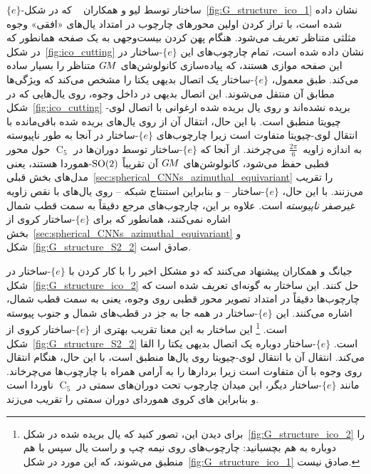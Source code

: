 $\{e\}$-ساختار توسط لیو و همکاران
~\cite{liu2018icoAltAz} که در شکل~\ref{fig:G_structure_ico_1} نشان داده شده است، با تراز کردن اولین محورهای چارچوب در امتداد یال‌های «افقی» وجوه مثلثی متناظر تعریف می‌شود.
هنگام پهن کردن بیست‌وجهی به یک صفحه همانطور که در شکل~\ref{fig:ico_cutting} نشان داده شده است، تمام چارچوب‌های این $\{e\}$-ساختار در این صفحه موازی هستند، که پیاده‌سازی کانولوشن‌های $G\mkern-1.4muM$ متناظر را بسیار ساده می‌کند.
طبق معمول، $\{e\}$-ساختار یک اتصال بدیهی یکتا را مشخص می‌کند که ویژگی‌ها مطابق آن منتقل می‌شوند.
این اتصال بدیهی در داخل وجوه، روی یال‌هایی که در شکل~\ref{fig:ico_cutting} بریده نشده‌اند و روی یال بریده شده ارغوانی با اتصال لوی-چیویتا منطبق است.
با این حال، انتقال آن از روی یال‌های بریده شده باقی‌مانده با انتقال لوی-چیویتا متفاوت است زیرا چارچوب‌های $\{e\}$-ساختار در آنجا به طور ناپیوسته به اندازه زاویه~$\frac{2\pi}{6}$ می‌چرخند.
از آنجا که $\{e\}$-ساختار توسط دوران‌ها در $\operatorname{C}_5$ حول محور قطبی حفظ می‌شود، کانولوشن‌های $G\mkern-1.4muM$ آن تقریباً $\operatorname{SO}(2)$-هموردا هستند، یعنی مدل‌های بخش قبلی~\ref{sec:spherical_CNNs_azimuthal_equivariant} را تقریب می‌زنند.
با این حال، $\{e\}$-ساختار -- و بنابراین استنتاج شبکه -- روی یال‌های با نقص زاویه غیرصفر \emph{ناپیوسته} است.
علاوه بر این، چارچوب‌های مرجع دقیقاً به سمت قطب شمال اشاره نمی‌کنند، همانطور که برای $\{e\}$-ساختار کروی از بخش~\ref{sec:spherical_CNNs_azimuthal_equivariant} و شکل~\ref{fig:G_structure_S2_2} صادق است.


جیانگ و همکاران\cite{zhang2019orientation} پیشنهاد می‌کنند که دو مشکل اخیر را با کار کردن با $\{e\}$-ساختار در شکل~\ref{fig:G_structure_ico_2} حل کنند.
این ساختار به گونه‌ای تعریف شده است که چارچوب‌ها دقیقاً در امتداد تصویر محور قطبی روی وجوه، یعنی به سمت قطب شمال، اشاره می‌کنند.
این $\{e\}$-ساختار در همه جا به جز در قطب‌های شمال و جنوب پیوسته است.%
\footnote{
	برای دیدن این، تصور کنید که یال بریده شده در شکل~\ref{fig:G_structure_ico_2} را دوباره به هم بچسبانید:
	چارچوب‌های روی نیمه چپ و راست یال سپس با هم منطبق می‌شوند، که این مورد در شکل~\ref{fig:G_structure_ico_1} صادق نیست.
}
این ساختار به این معنا تقریب بهتری از $\{e\}$-ساختار کروی از شکل~\ref{fig:G_structure_S2_2} است.
$\{e\}$-ساختار دوباره یک اتصال بدیهی یکتا را القا می‌کند.
انتقال آن با انتقال لوی-چیویتا روی یال‌ها منطبق است، با این حال، هنگام انتقال روی وجوه با آن متفاوت است زیرا بردارها را به آرامی همراه با چارچوب‌ها می‌چرخاند.
مانند $\{e\}$-ساختار دیگر، این میدان چارچوب تحت دوران‌های سمتی در $\operatorname{C}_5$ ناوردا است و بنابراین های کروی هموردای دوران سمتی را تقریب می‌زند.


